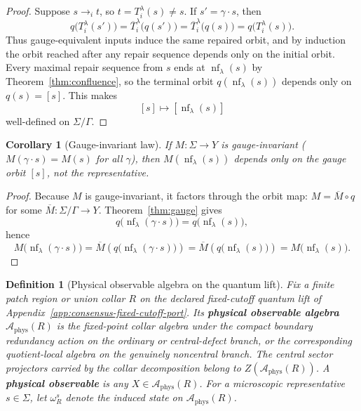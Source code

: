 \documentclass[11pt]{article}
\newtheorem{corollary}[theorem]{Corollary}
\newtheorem{definition}[theorem]{Definition}
\theoremstyle{remark}
\theoremstyle{plain}
\begin{document}
\begin{proof}
Suppose $s\to_i t$, so $t=T_i^\lambda(s)\neq s$. If $s'=\gamma\cdot s$, then
\[
q\bigl(T_i^\lambda(s')\bigr)
=
\overline T_i^\lambda\bigl(q(s')\bigr)
=
\overline T_i^\lambda\bigl(q(s)\bigr)
=
q\bigl(T_i^\lambda(s)\bigr).
\]
Thus gauge-equivalent inputs induce the same repaired orbit, and by induction the orbit reached
after any repair sequence depends only on the initial orbit. Every maximal repair sequence from
$s$ ends at $\operatorname{nf}_\lambda(s)$ by Theorem~\ref{thm:confluence}, so the terminal orbit
$q(\operatorname{nf}_\lambda(s))$ depends only on $q(s)=[s]$. This makes
\[
[s]\longmapsto [\operatorname{nf}_\lambda(s)]
\]
well-defined on $\Sigma/\Gamma$.
\end{proof}

\begin{corollary}[Gauge-invariant law]\label{cor:gaugeinv}
If $M:\Sigma\to Y$ is gauge-invariant ($M(\gamma\cdot s)=M(s)$ for all $\gamma$), then $M(\operatorname{nf}_\lambda(s))$ depends only on the gauge orbit $[s]$, not the representative.
\end{corollary}

\begin{proof}
Because $M$ is gauge-invariant, it factors through the orbit map: $M=\overline M\circ q$ for some
$\overline M:\Sigma/\Gamma\to Y$. Theorem~\ref{thm:gauge} gives
\[
q\bigl(\operatorname{nf}_\lambda(\gamma\cdot s)\bigr)
=
q\bigl(\operatorname{nf}_\lambda(s)\bigr),
\]
hence
\[
M\bigl(\operatorname{nf}_\lambda(\gamma\cdot s)\bigr)
=
\overline M\!\left(q\bigl(\operatorname{nf}_\lambda(\gamma\cdot s)\bigr)\right)
=
\overline M\!\left(q\bigl(\operatorname{nf}_\lambda(s)\bigr)\right)
=
M\bigl(\operatorname{nf}_\lambda(s)\bigr).
\]
\end{proof}

\begin{definition}[Physical observable algebra on the quantum lift]\label{def:physobs}
Fix a finite patch region or union collar \(R\) on the declared fixed-cutoff quantum lift of
Appendix~\ref{app:consensus-fixed-cutoff-port}. Its \textbf{physical observable algebra}
\(\mathcal A_{\mathrm{phys}}(R)\) is the fixed-point collar algebra under the compact boundary
redundancy action on the ordinary or central-defect branch, or the corresponding quotient-local
algebra on the genuinely noncentral branch. The central sector projectors carried by the collar
decomposition belong to \(Z(\mathcal A_{\mathrm{phys}}(R))\). A \textbf{physical observable} is
any \(X\in \mathcal A_{\mathrm{phys}}(R)\). For a microscopic representative \(s\in\Sigma\), let
\(\omega_R^s\) denote the induced state on \(\mathcal A_{\mathrm{phys}}(R)\).
\end{definition}
\end{document}
